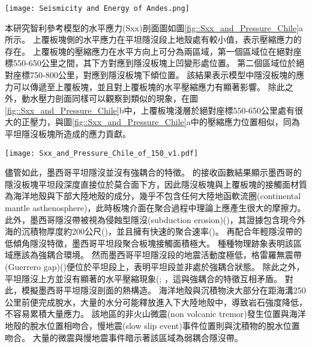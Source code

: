 \begin{figure*}[htp]
    \centering
    \texttt{[image: Seismicity and Energy of Andes.png]}
    \caption[智利沿岸自21$^\circ$S到44$^\circ$S的上板塊地震活動統計分析]{智利沿岸自20$^\circ$S到40$^\circ$S的上板塊地震活動統計分析，摘自\citealp{gutscher2002andean}。這裡採用深度<70公里的地震事件總能量，單位為10$^6$焦耳。右側數字表示1900-1963年/1964-1995年間所示分的第鎮能量。數字下灰色底框標示出平坦隱沒段的位置。
    }
    \label{fig::Chile_seismicity}
\end{figure*}

本研究智利參考模型的水平應力(Sxx)剖面圖如圖\ref{fig::Sxx_and_Pressure_Chile}a所示。
上覆板塊側的水平應力在平坦隱沒段上地殼處有較小值，表示壓縮應力的存在。
上覆板塊的壓縮應力在水平方向上可分為兩區域，第一個區域位在絕對座標550-650公里之間，其下方對應到隱沒板塊上凹變形處位置。
第二個區域位於絕對座標750-800公里，對應到隱沒板塊下傾位置。
該結果表示模型中隱沒板塊的應力可以傳遞至上覆板塊，並且對上覆板塊的水平壓縮應力有顯著影響。
除此之外，動水壓力剖面同樣可以觀察到類似的現象，在圖\ref{fig::Sxx_and_Pressure_Chile}b中，上覆板塊淺層於絕對座標550-650公里處有很大的正壓力，與圖\ref{fig::Sxx_and_Pressure_Chile}a中的壓縮應力位置相似，同為平坦隱沒板塊所造成的應力貢獻。


\begin{figure*}[h]
    \centering
    \texttt{[image: Sxx\_and\_Pressure\_Chile\_of\_150\_v1.pdf]}
    \caption[參考模型中於30 Myr的動水壓力剖面]{參考模型中於30 Myr的動水壓力剖面。}
    \label{fig::Sxx_and_Pressure_Chile}
\end{figure*}

儘管如此，墨西哥平坦隱沒並沒有強耦合的特徵。
\citealp{PerezCampos2008}的接收函數結果顯示墨西哥的隱沒板塊平坦段深度直接位於莫合面下方，因此隱沒板塊與上覆板塊的接觸面材質為海洋地殼與下部大陸地殼的成分，幾乎不包含任何大陸地函軟流圈(continental mantle asthenosphere)，此時板塊介面在聚合過程中理論上應產生很大的摩擦力。
此外，墨西哥隱沒帶被視為侵蝕型隱沒(subduction erosion)(\citealp{stern2011subduction})，其證據包含現今外海的沉積物厚度約200公尺(\citealp{manea2003sediment})，並且擁有快速的聚合速率(\citealp{o2005uncertainties})。
再配合年輕隱沒帶的低傾角隱沒特徵，墨西哥平坦段聚合板塊接觸面積極大。
種種物理跡象表明該區域應該為強耦合環境。
然而墨西哥平坦隱沒段的地震活動度極低，格雷羅無震帶(Guerrero gap)(\citealp{kostoglodov2003large})便位於平坦段上，表明平坦段並非處於強耦合狀態。
除此之外，平坦隱沒上方並沒有顯著的水平壓縮現象(\citealp{nieto2006latest}; \citealp{moran2007cenozoic}，這與強耦合的特徵互相矛盾。
對此，\citealp{Manea2011Thermal}模擬墨西哥平坦隱沒剖面的熱構造。
海洋地殼與沉積物決大部分在距海溝250公里前便完成脫水，大量的水分可能釋放進入下大陸地殼中，導致岩石強度降低，不容易累積大量應力。
該地區的非火山微震(non volcanic tremor)發生位置與海洋地殼的脫水位置相吻合\citealp{Manea2011Thermal}，慢地震(slow slip event)事件位置則與沈積物的脫水位置吻合\citealp{Song2009}。
大量的微震與慢地震事件暗示著該區域為弱耦合隱沒帶。

